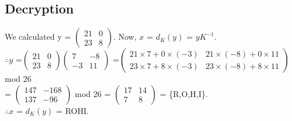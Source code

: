 \documentclass[12pt]{article}
\begin{document}
\begin{large}
\subsection{Decryption}
We calculated y
= $\begin{pmatrix}
21&0\\23&8
\end{pmatrix}$. Now, $x$ = $d_K(y)$ = $yK^{-1}$.\\
$\therefore y$
=$\begin{pmatrix}
21&0\\23&8
\end{pmatrix}
\begin{pmatrix}
7&-8\\-3&11
\end{pmatrix}$
=$\begin{pmatrix}
21\times7+0\times(-3) & 21\times(-8)+0\times11\\
23\times7+8\times(-3) & 23\times(-8)+8\times11
\end{pmatrix}$mod 26\\
= $\begin{pmatrix}
147&-168\\137&-96
\end{pmatrix}$ mod 26
= $\begin{pmatrix}
17&14\\7&8
\end{pmatrix}$ = \{R,O,H,I\}.\\
$\therefore x$ = $d_K(y)$ = ROHI.

\end{large}
\end{document}
